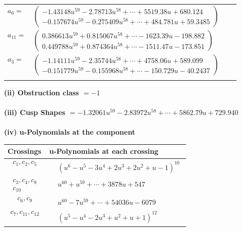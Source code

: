 \documentclass[1p]{elsarticle_modified}
\theoremstyle{definition}
\begin{document}
\begin{tabular}{m{7pt} m{180pt} m{7pt} m{180pt} }
\flushright $a_{6}=$&$\begin{pmatrix}-1.43148 u^{59}-2.78713 u^{58}+\cdots+5519.38 u+680.124\\-0.157674 u^{59}-0.275409 u^{58}+\cdots+484.781 u+59.3485\end{pmatrix}$ \\
\flushright $a_{11}=$&$\begin{pmatrix}0.386613 u^{59}+0.815067 u^{58}+\cdots-1623.39 u-198.882\\0.449788 u^{59}+0.874364 u^{58}+\cdots-1511.47 u-173.851\end{pmatrix}$ \\
\flushright $a_{3}=$&$\begin{pmatrix}-1.14111 u^{59}-2.35744 u^{58}+\cdots+4758.06 u+589.099\\-0.151779 u^{59}-0.155968 u^{58}+\cdots-150.729 u-40.2437\end{pmatrix}$\\&\end{tabular}
\flushleft \textbf{(ii) Obstruction class $= -1$}\\~\\
\flushleft \textbf{(iii) Cusp Shapes $= -1.32061 u^{59}-2.83972 u^{58}+\cdots+5862.79 u+729.940$}\\~\\
\newpage\renewcommand{\arraystretch}{1}
\flushleft \textbf{(iv) u-Polynomials at the component}\newline \\
\begin{tabular}{m{50pt}|m{274pt}}
Crossings & \hspace{64pt}u-Polynomials at each crossing \\
\hline $$\begin{aligned}c_{1},c_{2},c_{5}\end{aligned}$$&$\begin{aligned}
&(u^6- u^5-3 u^4+2 u^3+2 u^2+u-1)^{10}
\end{aligned}$\\
\hline $$\begin{aligned}c_{3},c_{4},c_{8}\\c_{10}\end{aligned}$$&$\begin{aligned}
&u^{60}+u^{59}+\cdots+3878 u+547
\end{aligned}$\\
\hline $$\begin{aligned}c_{6},c_{9}\end{aligned}$$&$\begin{aligned}
&u^{60}-7 u^{59}+\cdots+54036 u-6079
\end{aligned}$\\
\hline $$\begin{aligned}c_{7},c_{11},c_{12}\end{aligned}$$&$\begin{aligned}
&(u^5- u^4-2 u^3+u^2+u+1)^{12}
\end{aligned}$\\
\hline
\end{tabular}\\~\\
\end{document}
